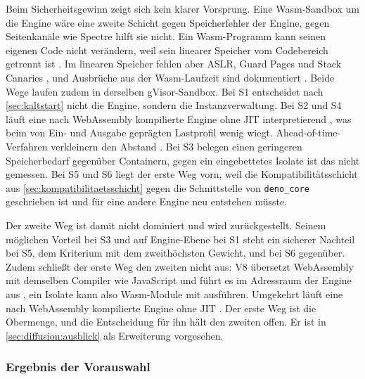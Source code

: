 Beim Sicherheitsgewinn zeigt sich kein klarer Vorsprung. Eine Wasm-Sandbox um die Engine wäre eine zweite Schicht
gegen Speicherfehler der Engine, gegen Seitenkanäle wie Spectre hilft sie nicht. Ein Wasm-Programm kann seinen eigenen Code nicht verändern, weil sein linearer Speicher vom Codebereich getrennt ist \autocite[S.~188]{haas_bringing_2017}. Im linearen Speicher fehlen aber \ac{ASLR}, Guard Pages und Stack Canaries
\autocite[S.~218, 221]{lehmann_everything_2020}, und Ausbrüche aus der Wasm-Laufzeit sind dokumentiert
\autocite{bytecode_alliance_wasmtimes_2026}. Beide Wege laufen zudem in derselben gVisor-Sandbox. Bei S1 entscheidet
nach \autoref{sec:kaltstart} nicht die Engine, sondern die Instanzverwaltung. Bei S2 und S4 läuft eine nach
WebAssembly kompilierte Engine ohne \ac{JIT} interpretierend \autocite{igalia_five_2026}, was beim von Ein- und
Ausgabe geprägten Lastprofil wenig wiegt. Ahead-of-time-Verfahren verkleinern den Abstand
\autocite[S.~160:3]{fallin_partial_2025}. Bei S3 belegen \textcite[S.~419]{shillaker_faasm_2020} einen geringeren Speicherbedarf gegenüber Containern, gegen ein eingebettetes Isolate ist das nicht gemessen. Bei S5 und S6 liegt der erste Weg vorn, weil die
Kompatibilitätsschicht aus \autoref{sec:kompatibilitaetsschicht} gegen die Schnittstelle von \texttt{deno\_core}
geschrieben ist und für eine andere Engine neu entstehen müsste.

Der zweite Weg ist damit nicht dominiert und wird zurückgestellt. Seinem möglichen Vorteil bei S3 und auf
Engine-Ebene bei S1 steht ein sicherer Nachteil bei S5, dem Kriterium mit dem zweithöchsten Gewicht, und bei S6
gegenüber. Zudem schließt der erste Weg den zweiten nicht aus: V8 übersetzt WebAssembly mit demselben Compiler wie JavaScript und führt es im Adressraum der Engine aus \autocite[S.~188, 196]{haas_bringing_2017}, ein Isolate kann also Wasm-Module mit ausführen. Umgekehrt läuft eine nach WebAssembly kompilierte Engine ohne \ac{JIT} \autocite{igalia_five_2026}. Der erste Weg ist die Obermenge, und die Entscheidung für ihn
hält den zweiten offen. Er ist in \autoref{sec:diffusion:ausblick} als Erweiterung vorgesehen.

\subsubsection{Ergebnis der Vorauswahl}
\label{sec:vorauswahl-ergebnis}

